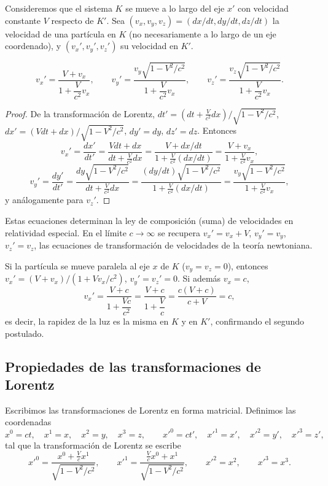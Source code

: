 Consideremos que el sistema $K$ se mueve a lo largo del eje $x'$ con
velocidad constante $V$ respecto de $K'$. Sea $(v_x,v_y,v_z) =
(dx/dt,dy/dt,dz/dt)$ la velocidad de una partícula en $K$ (no
necesariamente a lo largo de un eje coordenado), y $(v_x',v_y',v_z')$ su
velocidad en $K'$.

\begin{proposicionc}
\[
v_x' = \frac{V+v_x}{1+\dfrac{V}{c^2}v_x}, \qquad v_y' = \frac{v_y
\sqrt{1-V^2/c^2}}{1+\dfrac{V}{c^2}v_x}, \qquad v_z' = \frac{v_z\sqrt{1-
V^2/c^2}}{1+\dfrac{V}{c^2}v_x} .
\]
\end{proposicionc}

\begin{proof}
De la transformación de Lorentz, $dt' = (dt+\frac{V}{c^2}dx)/
\sqrt{1-V^2/c^2}$, $dx'=(Vdt+dx)/\sqrt{1-V^2/c^2}$, $dy'=dy$, $dz'=dz$.
Entonces
\[
v_x' = \frac{dx'}{dt'} = \frac{Vdt+dx}{dt+\frac{V}{c^2}dx} =
\frac{V+dx/dt}{1+\frac{V}{c^2}(dx/dt)} = \frac{V+v_x}{1+\frac{V}{c^2}
v_x},
\]
\[
v_y' = \frac{dy'}{dt'} = \frac{dy\sqrt{1-V^2/c^2}}{dt+\frac{V}{c^2}dx} =
\frac{(dy/dt)\sqrt{1-V^2/c^2}}{1+\frac{V}{c^2}(dx/dt)} = \frac{v_y
\sqrt{1-V^2/c^2}}{1+\frac{V}{c^2}v_x},
\]
y análogamente para $v_z'$. \qedhere
\end{proof}

Estas ecuaciones determinan la ley de composición (suma) de velocidades
en relatividad especial. En el límite $c\to\infty$ se recupera
$v_x'=v_x+V$, $v_y'=v_y$, $v_z'=v_z$, las ecuaciones de transformación de
velocidades de la teoría newtoniana.

\begin{ejemplo}
Si la partícula se mueve paralela al eje $x$ de $K$ ($v_y=v_z=0$),
entonces $v_x' = (V+v_x)/(1+Vv_x/c^2)$, $v_y'=v_z'=0$. Si además
$v_x=c$,
\[
v_x' = \frac{V+c}{1+\dfrac{Vc}{c^2}} = \frac{V+c}{1+\dfrac{V}{c}} =
\frac{c(V+c)}{c+V} = c,
\]
es decir, la rapidez de la luz es la misma en $K$ y en $K'$, confirmando
el segundo postulado.
\end{ejemplo}

\subsection{Propiedades de las transformaciones de Lorentz}

Escribimos las transformaciones de Lorentz en forma matricial. Definimos
las coordenadas
\[
x^0=ct, \quad x^1=x, \quad x^2=y, \quad x^3=z, \qquad x'^0=ct',\quad
x'^1=x',\quad x'^2=y',\quad x'^3=z',
\]
tal que la transformación de Lorentz se escribe
\[
x'^0 = \frac{x^0+\frac{V}{c}x^1}{\sqrt{1-V^2/c^2}}, \qquad x'^1 =
\frac{\frac{V}{c}x^0+x^1}{\sqrt{1-V^2/c^2}}, \qquad x'^2=x^2, \qquad
x'^3=x^3.
\]

